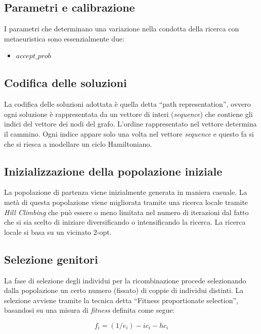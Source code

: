 \documentclass[a4paper]{article}
\begin{document}
        \subsection{Parametri e calibrazione}
            I parametri che determinano una variazione nella condotta della ricerca con metaeuristica sono essenzialmente due:
            \begin{itemize}
                \item $accept\_prob$
            \end{itemize}

        \subsection{Codifica delle soluzioni}
            La codifica delle soluzioni adottata \`e quella detta ``path representation'', ovvero
            ogni soluzione \`e rappresentata da un vettore di interi (\emph{sequence}) che contiene
            gli indici del vettore dei nodi del grafo. L'ordine rappresentato nel vettore determina il cammino.
            Ogni indice appare solo una volta nel vettore \emph{sequence} e questo fa si che si riesca a modellare
            un ciclo Hamiltoniano.

        \subsection{Inizializzazione della popolazione iniziale}
            La popolazione di partenza viene inizialmente generata in maniera casuale. La met\`a di questa popolazione
            viene migliorata tramite una ricerca locale tramite \emph{Hill Climbing} che pu\`o essere o meno limitata
            nel numero di iterazioni dal fatto che si sia scelto di iniziare diversificando o intensificando la ricerca.
            La ricerca locale si basa su un vicinato 2-opt.

        \subsection{Selezione genitori}
            La fase di selezione degli individui per la ricombinazione procede selezionando dalla popolazione un certo numero
            (fissato) di coppie di individui distinti.
            La selezione avviene tramite la tecnica detta ``Fitness proportionate selection'', basandosi su una misura di \emph{fitness}
            definita come segue:

            $$f_i = (1 / e_i) - ic_i - hc_i$$
\end{document}
